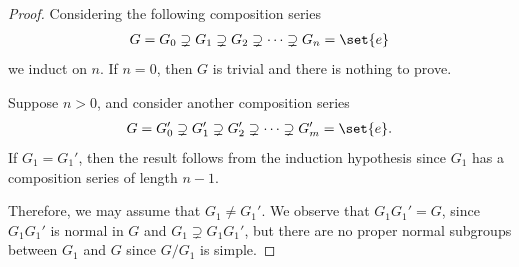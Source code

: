 \documentclass[10pt]{mypackage}
\begin{document}
\begin{proof}
  Considering the following composition series
  \begin{align*}
    G = G_0\supsetneq G_1\supsetneq G_2\supsetneq\cdots\supsetneq G_n = \set{e}
  \end{align*}
  we induct on $n$. If $n = 0$, then $G$ is trivial and there is nothing to prove.

  Suppose $n > 0$, and consider another composition series
  \begin{align*}
    G = G_0'\supsetneq G_1'\supsetneq G_2'\supsetneq\cdots\supsetneq G_m' = \set{e}.
  \end{align*}
  If $G_1 = G_1'$, then the result follows from the induction hypothesis since $G_1$ has a composition series of length $n-1$.

  Therefore, we may assume that $G_1 \neq G_1'$. We observe that $G_1G_1' = G$, since $G_1G_1'$ is normal in $G$ and $G_1\supsetneq G_1G_1'$, but there are no proper normal subgroups between $G_1$ and $G$ since $G/G_1$ is simple.


\end{proof}
\end{document}

